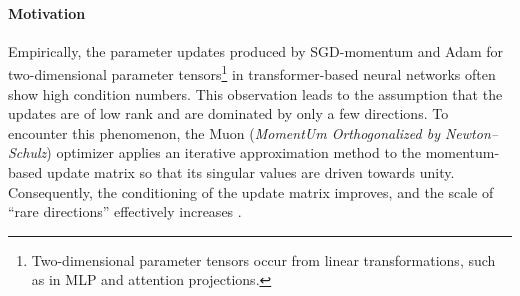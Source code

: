 \paragraph*{Motivation} Empirically, the parameter updates produced by SGD-momentum and Adam for two-dimensional parameter tensors\footnote{Two-dimensional parameter tensors occur from linear transformations, such as in MLP and attention projections.} in transformer-based neural networks often show high condition numbers. This observation leads to the assumption that the updates are of low rank and are dominated by only a few directions. To encounter this phenomenon, the Muon (\emph{MomentUm Orthogonalized by Newton--Schulz}) optimizer applies an iterative approximation method to the momentum-based update matrix so that its singular values are driven towards unity. Consequently, the conditioning of the update matrix improves, and the scale of ``rare directions'' effectively increases \cite{jordan2024muon}.

